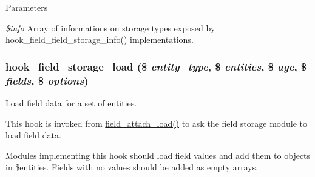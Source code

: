 \begin{DoxyParams}{Parameters}
\item[{\em \$info}]Array of informations on storage types exposed by hook\_\-field\_\-field\_\-storage\_\-info() implementations. \end{DoxyParams}
\hypertarget{group__field__storage_gac9885dcd8f5d74b5f3137d7af40cf958}{
\subsubsection[{hook\_\-field\_\-storage\_\-load}]{\setlength{\rightskip}{0pt plus 5cm}hook\_\-field\_\-storage\_\-load (\$ {\em entity\_\-type}, \/  \$ {\em entities}, \/  \$ {\em age}, \/  \$ {\em fields}, \/  \$ {\em options})}}
\label{group__field__storage_gac9885dcd8f5d74b5f3137d7af40cf958}
Load field data for a set of entities.

This hook is invoked from \hyperlink{group__field__attach_ga1e92543395961c912eb293b50e991586}{field\_\-attach\_\-load()} to ask the field storage module to load field data.

Modules implementing this hook should load field values and add them to objects in \$entities. Fields with no values should be added as empty arrays.



